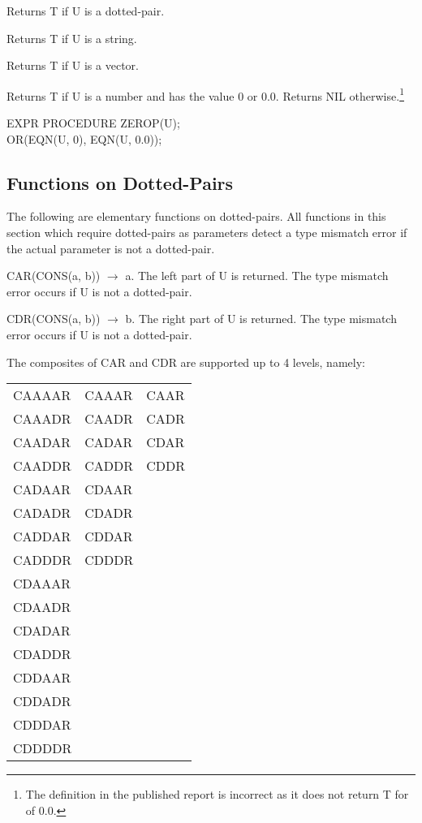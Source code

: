 {Returns T if U is a dotted-pair. }


{Returns T if U is a string. }


{Returns T if U is a vector. }


{Returns T if U is a number and has the value 0 or 0.0.  Returns NIL
otherwise.\footnote{The definition in the published report is
incorrect as it does not return T for  of 0.0.}

{\tt \begin{tabbing} EXPR PROCEDURE ZEROP(U); \\
\hspace*{1em} OR(EQN(U, 0), EQN(U, 0.0));
\end{tabbing}}}


\subsection{Functions on Dotted-Pairs}

The following are elementary functions on dotted-pairs. All functions
in this section which require dotted-pairs as parameters detect a type
mismatch error if the actual parameter is not a dotted-pair.



{CAR(CONS(a, b)) $\rightarrow$ a. The left part of U is returned. The
type
mismatch error occurs if U is not a dotted-pair.}


{CDR(CONS(a, b)) $\rightarrow$ b. The right part of U is returned. The
type
mismatch error occurs if U is not a dotted-pair.}


The composites of CAR and CDR are supported up to 4 levels, namely:
 

\hspace*{1in}\begin{tabular}{l l l}
CAAAAR & CAAAR & CAAR \\ CAAADR & CAADR & CADR \\ CAADAR & CADAR &
CDAR \\ CAADDR & CADDR & CDDR \\ CADAAR & CDAAR & \\ CADADR & CDADR &
\\ CADDAR & CDDAR & \\ CADDDR & CDDDR & \\ CDAAAR & & \\ CDAADR & & \\
CDADAR & & \\ CDADDR & & \\ CDDAAR & & \\ CDDADR & & \\ CDDDAR & & \\
CDDDDR & &
\end{tabular}

